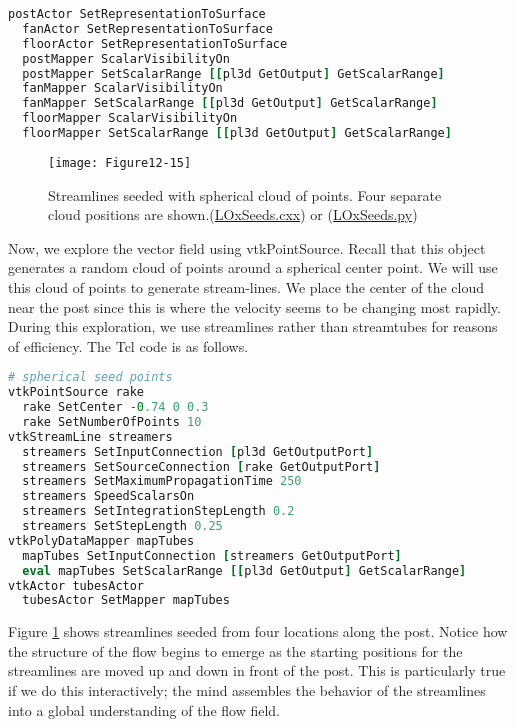 \begin{lstlisting}[language=TCL, caption={Dicplay the scalar field.}]
  postActor SetRepresentationToSurface
  fanActor SetRepresentationToSurface
  floorActor SetRepresentationToSurface
  postMapper ScalarVisibilityOn
  postMapper SetScalarRange [[pl3d GetOutput] GetScalarRange]
  fanMapper ScalarVisibilityOn
  fanMapper SetScalarRange [[pl3d GetOutput] GetScalarRange]
  floorMapper ScalarVisibilityOn
  floorMapper SetScalarRange [[pl3d GetOutput] GetScalarRange]
\end{lstlisting}

\begin{figure}[!htb]
	\centering
	\texttt{[image: Figure12-15]}
	\caption{Streamlines seeded with spherical cloud of points. Four separate cloud positions are shown.(\href{https://lorensen.github.io/VTKExamples/site/Cxx/VisualizationAlgorithms/LOxSeeds/}{LOxSeeds.cxx}) or (\href{https://lorensen.github.io/VTKExamples/site/Python/VisualizationAlgorithms/LOxSeeds/}{LOxSeeds.py})}
	\label{fig:Figure12-15}
\end{figure}


Now, we explore the vector field using vtkPointSource. Recall that this object generates a random cloud of points around a spherical center point. We will use this cloud of points to generate stream-lines. We place the center of the cloud near the post since this is where the velocity seems to be changing most rapidly. During this exploration, we use streamlines rather than streamtubes for reasons of efficiency. The Tcl code is as follows.

\begin{lstlisting}[language=TCL, caption={Explore the vector field using a point source.}]
# spherical seed points
vtkPointSource rake
  rake SetCenter -0.74 0 0.3
  rake SetNumberOfPoints 10
vtkStreamLine streamers
  streamers SetInputConnection [pl3d GetOutputPort]
  streamers SetSourceConnection [rake GetOutputPort]
  streamers SetMaximumPropagationTime 250
  streamers SpeedScalarsOn
  streamers SetIntegrationStepLength 0.2
  streamers SetStepLength 0.25
vtkPolyDataMapper mapTubes
  mapTubes SetInputConnection [streamers GetOutputPort]
  eval mapTubes SetScalarRange [[pl3d GetOutput] GetScalarRange]
vtkActor tubesActor
  tubesActor SetMapper mapTubes
\end{lstlisting}

Figure \ref{fig:Figure12-15} shows streamlines seeded from four locations along the post.
Notice how the structure of the flow begins to emerge as the starting positions for the streamlines are moved up and down in front of the post. This is particularly true if we do this interactively; the mind assembles the behavior of the streamlines into a global understanding of the flow field.

